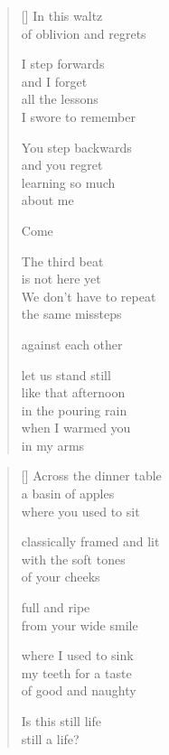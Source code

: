 \documentclass[12pt,a4paper]{article}
\begin{document}
\bigskip

\begin{verse}[\versewidth]
  In this waltz \\
  of oblivion and regrets

  I step forwards \\
  and I forget \\
  all the lessons \\
  I swore to remember

  You step backwards \\
  and you regret \\
  learning so much \\
  about me

  Come

  The third beat \\
  is not here yet \\
  We don't have to repeat \\
  the same missteps

  against each other

  let us stand still \\
  like that afternoon \\
  in the pouring rain \\
  when I warmed you \\
  in my arms
\end{verse}


\newpage

\poemtitle{}

\settowidth{\versewidth}{Across the dinner table}

\bigskip

\begin{verse}[\versewidth]
Across the dinner table \\
a basin of apples \\
where you used to sit

classically framed and lit \\
with the soft tones \\
of your cheeks

full and ripe \\
from your wide smile

where I used to sink \\
my teeth for a taste \\
of good and naughty

Is this still life \\
still a life?
\end{verse}
\end{document}
